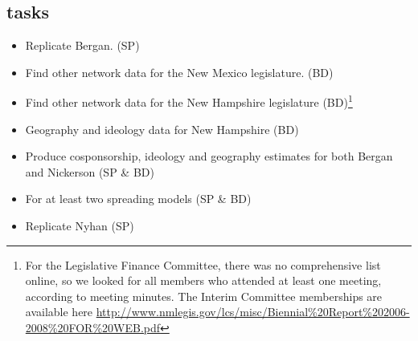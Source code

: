 \documentclass[12pt]{article}
\begin{document}
\subsection{tasks}
\begin{itemize}
\item Replicate Bergan. (SP)
\item Find other network data for the New Mexico legislature. (BD)
\item Find other network data for the New Hampshire legislature (BD)\footnote{For the Legislative Finance Committee, there was no comprehensive list online, so we looked for all members who attended at least one meeting, according to meeting minutes. The Interim Committee memberships are available here \url{http://www.nmlegis.gov/lcs/misc/Biennial\%20Report\%202006-2008\%20FOR\%20WEB.pdf}}
\item Geography and ideology data for New Hampshire (BD)
\item Produce cosponsorship, ideology and geography estimates for both Bergan and Nickerson (SP \& BD)
\item For at least two spreading models (SP \& BD)
\item Replicate Nyhan (SP)
\end{itemize}
\end{document}
